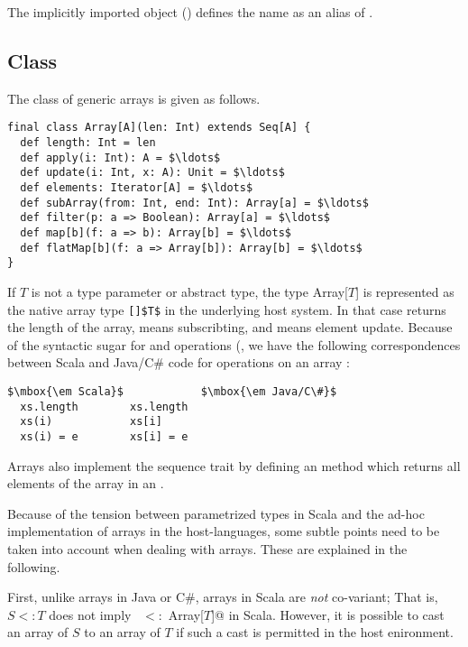 {{{The implicitly imported  object () defines the name 
 as an alias of .

\subsection{Class \large{}}\label{cls:array}

The class of generic arrays is given as follows.

\begin{lstlisting}
final class Array[A](len: Int) extends Seq[A] {
  def length: Int = len
  def apply(i: Int): A = $\ldots$
  def update(i: Int, x: A): Unit = $\ldots$
  def elements: Iterator[A] = $\ldots$
  def subArray(from: Int, end: Int): Array[a] = $\ldots$
  def filter(p: a => Boolean): Array[a] = $\ldots$
  def map[b](f: a => b): Array[b] = $\ldots$
  def flatMap[b](f: a => Array[b]): Array[b] = $\ldots$
}
\end{lstlisting}
If $T$ is not a type parameter or abstract type, the type Array[$T$]
is represented as the native array type \lstinline{[]$T$} in the
underlying host system. In that case  returns
the length of the array,  means subscribting, and
 means element update. Because of the syntactic sugar for
 and
 operations (,
we have the following correspondences between Scala and Java/C\# code for
operations on an array :

\begin{lstlisting}
$\mbox{\em Scala}$            $\mbox{\em Java/C\#}$
  xs.length        xs.length
  xs(i)            xs[i]
  xs(i) = e        xs[i] = e
\end{lstlisting}

Arrays also implement the sequence trait 
by defining an  method which returns
all elements of the array in an .

Because of the tension between parametrized types in Scala and the ad-hoc
implementation of arrays in the host-languages, some subtle points
need to be taken into account when dealing with arrays. These are
explained in the following.

First, unlike arrays in Java or C\#, arrays in Scala are {\em not}
co-variant; That is, $S <: T$ does not imply 
~\lstinline@Array[$S$] $<:$ Array[$T$]@ in Scala.  
However, it is possible to cast an array
of $S$ to an array of $T$ if such a cast is permitted in the host
enironment.

}}}
